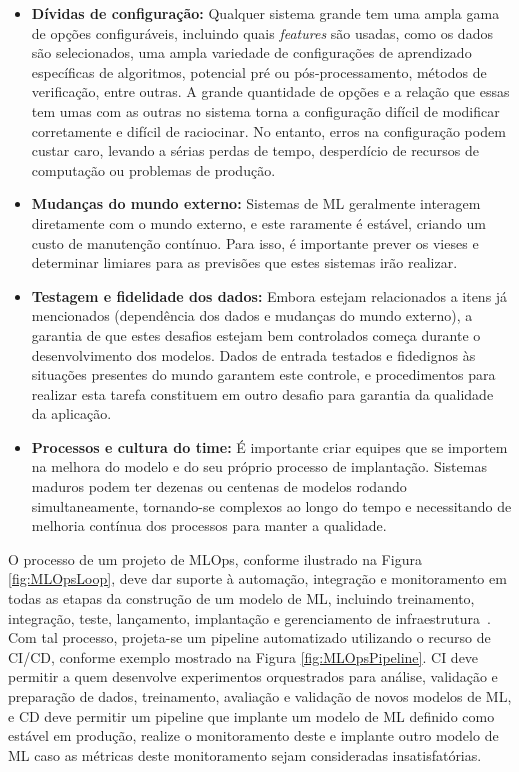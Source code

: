 \documentclass[Portugues,Final]{ic-tese-v3}
\begin{document}
\begin{itemize}
    \item \textbf{Dívidas de configuração:} Qualquer sistema grande tem uma ampla gama de opções configuráveis, incluindo quais \textit{features} são usadas, como os dados são selecionados, uma ampla variedade de configurações de aprendizado específicas de algoritmos, potencial pré ou pós-processamento, métodos de verificação, entre outras. A grande quantidade de opções e a relação que essas tem umas com as outras no sistema torna a configuração difícil de modificar corretamente e difícil de raciocinar. No entanto, erros na configuração podem custar caro, levando a sérias perdas de tempo, desperdício de recursos de computação ou problemas de produção.
    \item \textbf{Mudanças do mundo externo:} Sistemas de ML geralmente interagem diretamente com o mundo externo, e este raramente é estável, criando um custo de manutenção contínuo. Para isso, é importante prever os vieses e determinar limiares para as previsões que estes sistemas irão realizar.
    \item \textbf{Testagem e fidelidade dos dados:} Embora estejam relacionados a itens já mencionados (dependência dos dados e mudanças do mundo externo), a garantia de que estes desafios estejam bem controlados começa durante o desenvolvimento dos modelos. Dados de entrada testados e fidedignos às situações presentes do mundo garantem este controle, e procedimentos para realizar esta tarefa constituem em outro desafio para garantia da qualidade da aplicação.
    \item \textbf{Processos e cultura do time:} É importante criar equipes que se importem na melhora do modelo e do seu próprio processo de implantação. Sistemas maduros podem ter dezenas ou centenas de modelos rodando simultaneamente, tornando-se complexos ao longo do tempo e necessitando de melhoria contínua dos processos para manter a qualidade.
\end{itemize}

O processo de um projeto de MLOps, conforme ilustrado na Figura \ref{fig:MLOpsLoop}, deve dar suporte à automação, integração e monitoramento em todas as etapas da construção de um modelo de ML, incluindo treinamento, integração, teste, lançamento, implantação e gerenciamento de infraestrutura~\cite{Testi_2022}. Com tal processo, projeta-se um pipeline automatizado utilizando o recurso de CI/CD, conforme exemplo mostrado na Figura \ref{fig:MLOpsPipeline}. CI deve permitir a quem desenvolve experimentos orquestrados para análise, validação e preparação de dados, treinamento, avaliação e validação de novos modelos de ML, e CD deve permitir um pipeline que implante um modelo de ML definido como estável em produção, realize o monitoramento deste e implante outro modelo de ML caso as métricas deste monitoramento sejam consideradas insatisfatórias.
\end{document}
